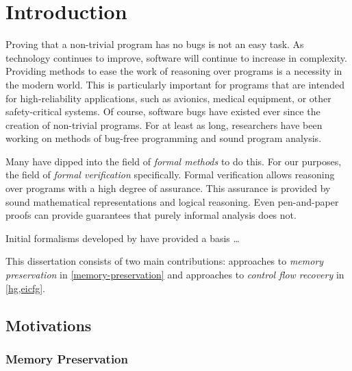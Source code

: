 \chapter{Introduction}
Proving that a non-trivial program has no bugs is not an easy task.
As technology continues to improve, software will continue to increase in complexity.
Providing methods to ease the work of reasoning over programs is a necessity in the modern world.
This is particularly important for programs that are intended for high-reliability applications,
such as avionics, medical equipment, or other safety-critical systems.
Of course, software bugs have existed ever since the creation of non-trivial programs.
For at least as long, researchers have been working on methods of bug-free programming and sound program analysis.

Many have dipped into the field of \emph{formal methods} \autocite{butler:fm} to do this.
For our purposes, the field of \emph{formal verification} specifically.
Formal verification allows reasoning over programs with a high degree of assurance.
This assurance is provided by sound mathematical representations and logical reasoning.
Even pen-and-paper proofs can provide guarantees that purely informal analysis does not.

Initial formalisms developed by \textcite{floyd1967assigning,hoare1969axiomatic} have provided a basis \todo\dots





This dissertation consists of two main contributions: approaches to \emph{memory preservation} in \cref{memory-preservation} and approaches to \emph{control flow recovery} in \cref{hg,eicfg}.



\section{Motivations}

\subsection{Memory Preservation}

